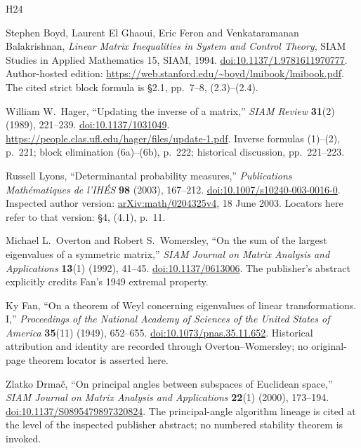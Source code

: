 \documentclass[11pt,a4paper]{article}
\begin{document}
\begin{thebibliography}{H24}

Stephen Boyd, Laurent El Ghaoui, Eric Feron and Venkataramanan Balakrishnan,
\emph{Linear Matrix Inequalities in System and Control Theory},
SIAM Studies in Applied Mathematics 15, SIAM, 1994.
\href{https://doi.org/10.1137/1.9781611970777}{doi:10.1137/1.9781611970777}.
Author-hosted edition: \url{https://web.stanford.edu/~boyd/lmibook/lmibook.pdf}.
The cited strict block formula is \S2.1, pp.~7--8, (2.3)--(2.4).

William W.~Hager, ``Updating the inverse of a matrix,''
\emph{SIAM Review} \textbf{31}(2) (1989), 221--239.
\href{https://doi.org/10.1137/1031049}{doi:10.1137/1031049}.
\url{https://people.clas.ufl.edu/hager/files/update-1.pdf}.
Inverse formulas (1)--(2), p.~221; block elimination (6a)--(6b),
p.~222; historical discussion, pp.~221--223.

Russell Lyons, ``Determinantal probability measures,''
\emph{Publications Math\'ematiques de l'IH\'ES} \textbf{98} (2003), 167--212.
\href{https://doi.org/10.1007/s10240-003-0016-0}{doi:10.1007/s10240-003-0016-0}.
Inspected author version: \href{https://arxiv.org/abs/math/0204325v4}{arXiv:math/0204325v4},
18 June 2003. Locators here refer to that version: \S4, (4.1), p.~11.

Michael L.~Overton and Robert S.~Womersley,
``On the sum of the largest eigenvalues of a symmetric matrix,''
\emph{SIAM Journal on Matrix Analysis and Applications}
\textbf{13}(1) (1992), 41--45.
\href{https://doi.org/10.1137/0613006}{doi:10.1137/0613006}.
The publisher's abstract explicitly credits Fan's 1949 extremal property.

Ky Fan, ``On a theorem of Weyl concerning eigenvalues of linear
transformations. I,'' \emph{Proceedings of the National Academy of
Sciences of the United States of America} \textbf{35}(11) (1949), 652--655.
\href{https://doi.org/10.1073/pnas.35.11.652}{doi:10.1073/pnas.35.11.652}.
Historical attribution and identity are recorded through Overton--Womersley;
no original-page theorem locator is asserted here.

Zlatko Drma\v c, ``On principal angles between subspaces of Euclidean space,''
\emph{SIAM Journal on Matrix Analysis and Applications}
\textbf{22}(1) (2000), 173--194.
\href{https://doi.org/10.1137/S0895479897320824}{doi:10.1137/S0895479897320824}.
The principal-angle algorithm lineage is cited at the level of the
inspected publisher abstract; no numbered stability theorem is invoked.


\end{thebibliography}
\end{document}
